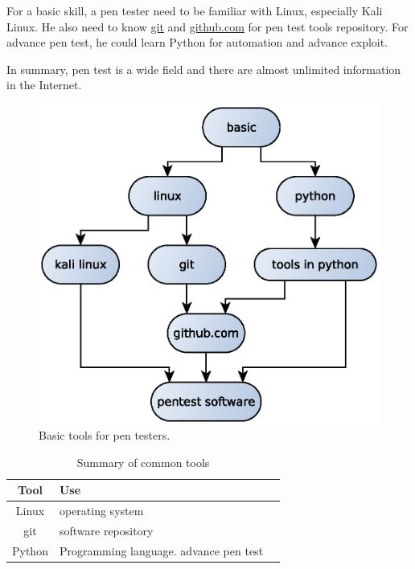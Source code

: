 \documentclass[7x9]{times}
\begin{document}
For a basic skill, a pen tester need to be familiar with
Linux, especially Kali Linux. He also need to know \url{git}
and \url{github.com} for pen test tools repository. For
advance pen test, he could learn Python for automation and
advance exploit.

In summary, pen test is a wide field and there are almost unlimited information
in the Internet. 
\begin{center}
	\begin{figure}[ht]
		\includegraphics[scale=.75]{tools}
		\caption{Basic tools for pen testers.}
	\end{figure}
\end{center}

\begin{table}[]
    \begin{tabular}{|c|l|c|}
        \hline 
        Tool & Use &  \\ 
        \hline 
        Linux & operating system &  \\ 
        \hline 
        git & software repository &  \\ 
        \hline 
        Python & Programming language. advance pen test &  \\ 
        \hline 
    \end{tabular}
    \caption{Summary of common tools}
    \label{tab:tools}
\end{table}
\end{document}
